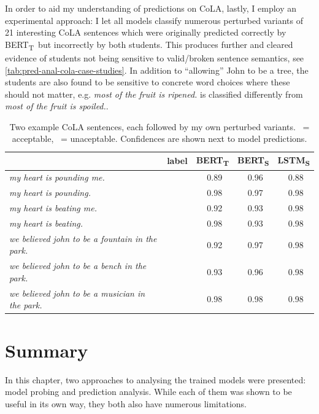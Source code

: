 \documentclass[bsc,frontabs,singlespacing,parskip,deptreport]{infthesis}
\newcommand{\cmark}{\ding{51}}%
\newcommand{\xmark}{\ding{55}}%
\def\BERTT{BERT\textsubscript{T}}
\def\BERTS{BERT\textsubscript{S}}
\def\LSTMS{LSTM\textsubscript{S}}
\begin{document}
{{    In order to aid my understanding of predictions on CoLA, lastly, I employ an experimental approach: I let all models classify numerous perturbed variants of 21 interesting CoLA sentences which were originally predicted correctly by \BERTT~but incorrectly by both students.
    This produces further and cleared evidence of students not being sensitive to valid/broken sentence semantics, see \autoref{tab:pred-anal-cola-case-studies}.
    In addition to ``allowing'' John to be a tree, the students are also found to be sensitive to concrete word choices where these should not matter, e.g. \textit{most of the fruit is ripened.} is classified differently from \textit{most of the fruit is spoiled.}.

    \begin{table}[h!tb]
      \centering
      \footnotesize
      \begin{tabular}{lcccc}
      \toprule
      & label & \BERTT & \BERTS & \LSTMS \\
      \toprule
      \textit{my heart is pounding me. }& \xmark & \xmark~0.89 & \cmark~0.96 & \cmark~0.88 \\
      \textit{my heart is pounding.    }& \cmark & \cmark~0.98 & \cmark~0.97 & \cmark~0.98 \\
      \textit{my heart is beating me.  }& \xmark & \xmark~0.92 & \cmark~0.93 & \cmark~0.98 \\
      \textit{my heart is beating.     }& \cmark & \cmark~0.98 & \cmark~0.93 & \cmark~0.98 \\
      \textit{we believed john to be a fountain in the park.}  &\xmark & \xmark~0.92 & \cmark~0.97 & \cmark~0.98 \\
      \textit{we believed john to be a bench in the park.   }  &\xmark & \xmark~0.93 & \cmark~0.96 & \cmark~0.98 \\
      \textit{we believed john to be a musician in the park.}  &\cmark & \cmark~0.98 & \cmark~0.98 & \cmark~0.98 \\
      \bottomrule
      \end{tabular}
      \caption{Two example CoLA sentences, each followed by my own perturbed variants. \cmark~= acceptable, \xmark~= unaceptable. Confidences are shown next to model predictions.}
      \label{tab:pred-anal-cola-case-studies}
    \end{table}
  }

  \section{Summary}{
    In this chapter, two approaches to analysing the trained models were presented: model probing and prediction analysis.
    While each of them was shown to be useful in its own way, they both also have numerous limitations.

}}
\end{document}
